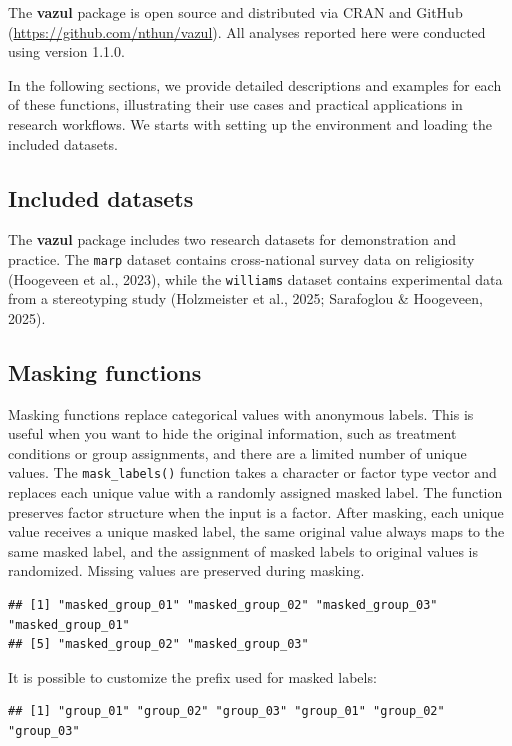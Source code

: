 \documentclass[
  english,
  man,floatsintext]{apa6}
\begin{document}
The \textbf{vazul} package is open source and distributed via CRAN and GitHub (\url{https://github.com/nthun/vazul}). All analyses reported here were conducted using version 1.1.0.

In the following sections, we provide detailed descriptions and examples for each of these functions, illustrating their use cases and practical applications in research workflows. We starts with setting up the environment and loading the included datasets.

\subsection{Included datasets}\label{included-datasets}

The \textbf{vazul} package includes two research datasets for demonstration and practice. The \texttt{marp} dataset contains cross-national survey data on religiosity (Hoogeveen et al., 2023), while the \texttt{williams} dataset contains experimental data from a stereotyping study (Holzmeister et al., 2025; Sarafoglou \& Hoogeveen, 2025).

\subsection{Masking functions}\label{masking-functions}

Masking functions replace categorical values with anonymous labels. This is useful when you want to hide the original information, such as treatment conditions or group assignments, and there are a limited number of unique values. The \texttt{mask\_labels()} function takes a character or factor type vector and replaces each unique value with a randomly assigned masked label. The function preserves factor structure when the input is a factor. After masking, each unique value receives a unique masked label, the same original value always maps to the same masked label, and the assignment of masked labels to original values is randomized. Missing values are preserved during masking.

\begin{verbatim}
## [1] "masked_group_01" "masked_group_02" "masked_group_03" "masked_group_01"
## [5] "masked_group_02" "masked_group_03"
\end{verbatim}

It is possible to customize the prefix used for masked labels:

\begin{verbatim}
## [1] "group_01" "group_02" "group_03" "group_01" "group_02" "group_03"
\end{verbatim}
\end{document}
